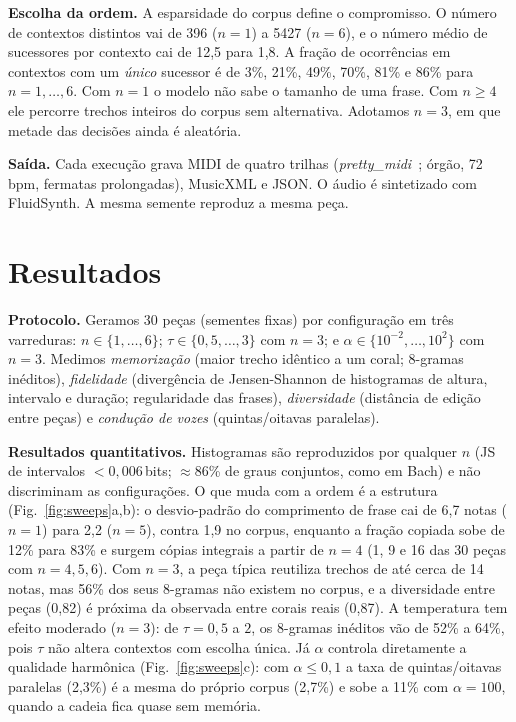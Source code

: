 \documentclass{article}
\begin{document}
\textbf{Escolha da ordem.} A esparsidade do corpus define o compromisso. O número de contextos distintos vai de 396 ($n=1$) a 5427 ($n=6$), e o número médio de sucessores por contexto cai de 12{,}5 para 1{,}8. A fração de ocorrências em contextos com um \emph{único} sucessor é de 3\%, 21\%, 49\%, 70\%, 81\% e 86\% para $n=1,\dots,6$. Com $n=1$ o modelo não sabe o tamanho de uma frase. Com $n\ge4$ ele percorre trechos inteiros do corpus sem alternativa. Adotamos $n=3$, em que metade das decisões ainda é aleatória.

\textbf{Saída.} Cada execução grava MIDI de quatro trilhas (\textit{pretty\_midi}~\cite{raffel2014}; órgão, 72\,bpm, fermatas prolongadas), MusicXML e JSON. O áudio é sintetizado com FluidSynth. A mesma semente reproduz a mesma peça.



\section{Resultados}\label{sec:results}
\textbf{Protocolo.} Geramos 30 peças (sementes fixas) por configuração em três varreduras: $n\in\{1,\dots,6\}$; $\tau\in\{0{,}5,\dots,3\}$ com $n=3$; e $\alpha\in\{10^{-2},\dots,10^{2}\}$ com $n=3$. Medimos \emph{memorização} (maior trecho idêntico a um coral; 8-gramas inéditos), \emph{fidelidade} (divergência de Jensen-Shannon de histogramas de altura, intervalo e duração; regularidade das frases), \emph{diversidade} (distância de edição entre peças) e \emph{condução de vozes} (quintas/oitavas paralelas).

\textbf{Resultados quantitativos.} Histogramas são reproduzidos por qualquer $n$ (JS de intervalos $<0{,}006$\,bits; $\approx$86\% de graus conjuntos, como em Bach) e não discriminam as configurações. O que muda com a ordem é a estrutura (Fig.~\ref{fig:sweeps}a,b): o desvio-padrão do comprimento de frase cai de 6{,}7 notas ($n=1$) para 2{,}2 ($n=5$), contra 1{,}9 no corpus, enquanto a fração copiada sobe de 12\% para 83\% e surgem cópias integrais a partir de $n=4$ (1, 9 e 16 das 30 peças com $n=4,5,6$). Com $n=3$, a peça típica reutiliza trechos de até cerca de 14 notas, mas 56\% dos seus 8-gramas não existem no corpus, e a diversidade entre peças (0{,}82) é próxima da observada entre corais reais (0{,}87). A temperatura tem efeito moderado ($n=3$): de $\tau=0{,}5$ a $2$, os 8-gramas inéditos vão de 52\% a 64\%, pois $\tau$ não altera contextos com escolha única. Já $\alpha$ controla diretamente a qualidade harmônica (Fig.~\ref{fig:sweeps}c): com $\alpha\le0{,}1$ a taxa de quintas/oitavas paralelas (2{,}3\%) é a mesma do próprio corpus (2{,}7\%) e sobe a 11\% com $\alpha=100$, quando a cadeia fica quase sem memória.
\end{document}
